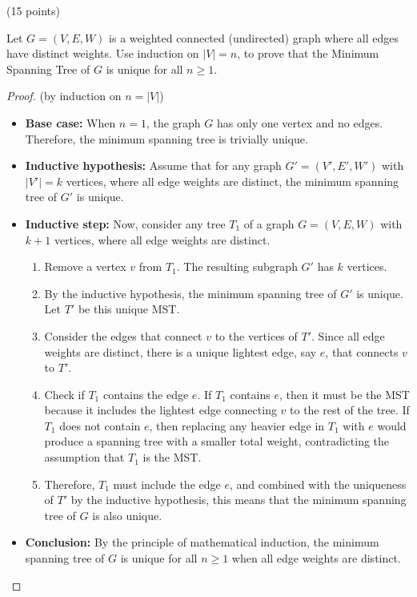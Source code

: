 \documentclass[12pt]{article}
\newcommand{\vs}{\vspace{2mm}}
\begin{document}
 (15 points)
\vs\

Let $G = (V,E,W)$ is a weighted connected (undirected) graph where all edges have distinct weights. Use induction on $|V|=n$, to prove that the Minimum Spanning Tree of $G$ is unique for all $n \geq 1$. 

\begin{proof} (by induction on $n = |V|$)
    \begin{itemize}
        \item \textbf{Base case:} When $n = 1$, the graph $G$ has only one vertex and no edges. Therefore, the minimum spanning tree is trivially unique.
        \item \textbf{Inductive hypothesis:} Assume that for any graph $G' = (V', E', W')$ with $|V'| = k$ vertices, where all edge weights are distinct, the minimum spanning tree of $G'$ is unique.
        \item \textbf{Inductive step:} Now, consider any tree $T_1$ of a graph $G = (V, E, W)$ with $k+1$ vertices, where all edge weights are distinct.
        \begin{enumerate}
            \item Remove a vertex $v$ from $T_1$. The resulting subgraph $G'$ has $k$ vertices.
            \item By the inductive hypothesis, the minimum spanning tree of $G'$ is unique. Let $T'$ be this unique MST.
            \item Consider the edges that connect $v$ to the vertices of $T'$. Since all edge weights are distinct, there is a unique lightest edge, say $e$, that connects $v$ to $T'$.
            \item Check if $T_1$ contains the edge $e$. If $T_1$ contains $e$, then it must be the MST because it includes the lightest edge connecting $v$ to the rest of the tree. If $T_1$ does not contain $e$, then replacing any heavier edge in $T_1$ with $e$ would produce a spanning tree with a smaller total weight, contradicting the assumption that $T_1$ is the MST.
            \item Therefore, $T_1$ must include the edge $e$, and combined with the uniqueness of $T'$ by the inductive hypothesis, this means that the minimum spanning tree of $G$ is also unique.
        \end{enumerate}
        \item \textbf{Conclusion:} By the principle of mathematical induction, the minimum spanning tree of $G$ is unique for all $n \geq 1$ when all edge weights are distinct.
    \end{itemize}

\end{proof}
\end{document}
